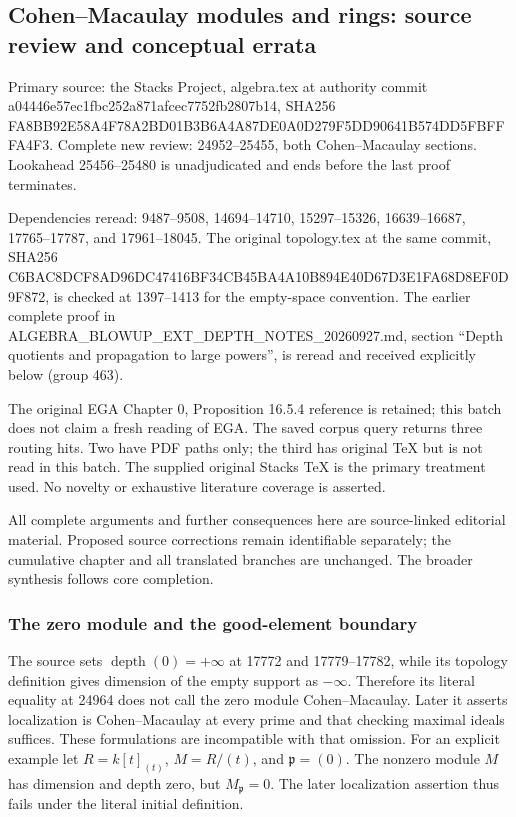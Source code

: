 \subsection{Cohen--Macaulay modules and rings: source review and conceptual errata}\label{algebra-proof-019-cohenmacaulay-modules-and-rings-source-review-and-conceptual-errata}

Primary source: the Stacks Project, algebra.tex at authority commit a04446e57ec1fbc252a871afcec7752fb2807b14, SHA256 FA8BB92E58A4F78A2BD01B3B6A4A87DE0A0D279F5DD90641B574DD5FBFFFA4F3. Complete new review: 24952--25455, both Cohen--Macaulay sections. Lookahead 25456--25480 is unadjudicated and ends before the last proof terminates.

Dependencies reread: 9487--9508, 14694--14710, 15297--15326, 16639--16687, 17765--17787, and 17961--18045. The original topology.tex at the same commit, SHA256 C6BAC8DCF8AD96DC47416BF34CB45BA4A10B894E40D67D3E1FA68D8EF0D9F872, is checked at 1397--1413 for the empty-space convention. The earlier complete proof in ALGEBRA\_BLOWUP\_EXT\_DEPTH\_NOTES\_20260927.md, section ``Depth quotients and propagation to large powers'', is reread and received explicitly below (group 463).

The original EGA Chapter 0, Proposition 16.5.4 reference is retained; this batch does not claim a fresh reading of EGA. The saved corpus query returns three routing hits. Two have PDF paths only; the third has original TeX but is not read in this batch. The supplied original Stacks TeX is the primary treatment used. No novelty or exhaustive literature coverage is asserted.

All complete arguments and further consequences here are source-linked editorial material. Proposed source corrections remain identifiable separately; the cumulative chapter and all translated branches are unchanged. The broader synthesis follows core completion.

\subsubsection{The zero module and the good-element boundary}\label{algebra-proof-019-the-zero-module-and-the-good-element-boundary}

The source sets \(\operatorname{depth}(0)=+\infty\) at 17772 and 17779--17782, while its topology definition gives dimension of the empty support as \(-\infty\). Therefore its literal equality at 24964 does not call the zero module Cohen--Macaulay. Later it asserts localization is Cohen--Macaulay at every prime and that checking maximal ideals suffices. These formulations are incompatible with that omission. For an explicit example let \(R=k[t]_{(t)}\), \(M=R/(t)\), and \(\mathfrak p=(0)\). The nonzero module \(M\) has dimension and depth zero, but \(M_{\mathfrak p}=0\). The later localization assertion thus fails under the literal initial definition.

